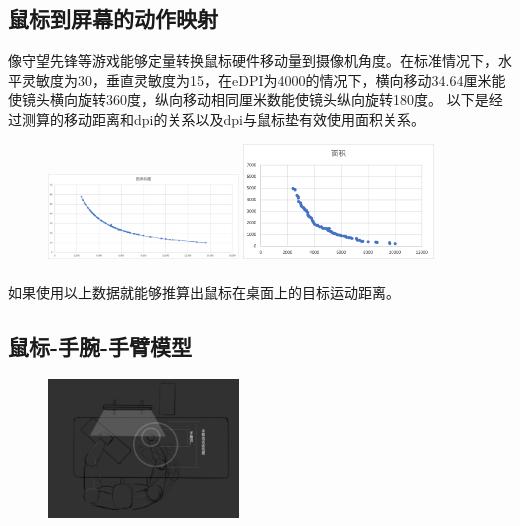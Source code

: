 \documentclass[UTF8]{ctexart}
\begin{document}
\subsection{鼠标到屏幕的动作映射}像守望先锋等游戏能够定量转换鼠标硬件移动量到摄像机角度。在标准情况下，水平灵敏度为30，垂直灵敏度为15，在eDPI为4000的情况下，横向移动34.64厘米能使镜头横向旋转360度，纵向移动相同厘米数能使镜头纵向旋转180度。
\newline
以下是经过测算的移动距离和dpi的关系以及dpi与鼠标垫有效使用面积关系。
\begin{figure}[htbp]
    \includegraphics[width=0.45\textwidth]{calculate.png}
    \includegraphics[width=0.45\textwidth]{field.png}
\end{figure}
\paragraph{}如果使用以上数据就能够推算出鼠标在桌面上的目标运动距离。


\subsection{鼠标-手腕-手臂模型}
    \begin{figure}[htbp]
        \centering
        \includegraphics[width=0.45\textwidth]{desktop.png}
    \end{figure}
\end{document}
